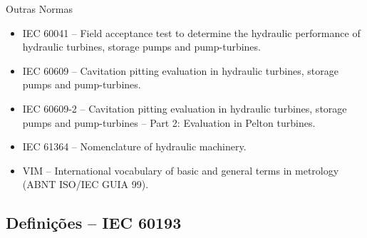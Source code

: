     \begin{frame}{Outras Normas}\vspace*{-1em}

        \begin{itemize}
            \item<1-> \alert{IEC 60041} -- Field acceptance test to determine the hydraulic
                performance of hydraulic turbines, storage pumps and pump-turbines.

            \item<1-> \alert{IEC 60609} -- Cavitation pitting evaluation in hydraulic turbines,
                storage pumps and pump-turbines.

            \item<1-> \alert{IEC 60609-2} -- Cavitation pitting evaluation in hydraulic
                turbines, storage pumps and pump-turbines – Part 2: Evaluation in Pelton
                turbines.

            \item<1-> \alert{IEC 61364} -- Nomenclature of hydraulic machinery.

            \item<1-> \alert{VIM} -- International vocabulary of basic and general terms in
                metrology (ABNT ISO/IEC GUIA 99).
        \end{itemize}

    \end{frame}

\subsection{Definições -- IEC 60193}

